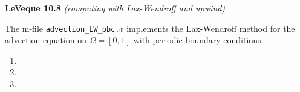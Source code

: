 \textbf{LeVeque 10.8}  \textit{(computing with Lax-Wendroff and upwind)}

The m-file \texttt{advection\_LW\_pbc.m} implements the Lax-Wendroff method for the advection equation on 
$\Omega = [0, 1]$ with periodic boundary conditions.

\begin{enumerate}
  \item 
  \pagebreak
  \item 
  \pagebreak
  \item 
\end{enumerate} 